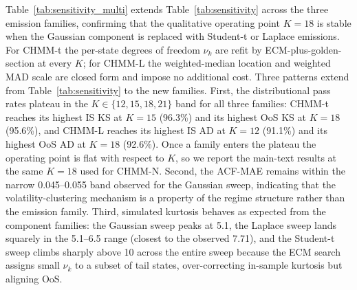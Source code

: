 Table~\ref{tab:sensitivity_multi} extends Table~\ref{tab:sensitivity} across the three emission families, confirming that the qualitative operating point $K = 18$ is stable when the Gaussian component is replaced with Student-t or Laplace emissions.
For CHMM-t the per-state degrees of freedom $\nu_k$ are refit by ECM-plus-golden-section at every $K$; for CHMM-L the weighted-median location and weighted MAD scale are closed form and impose no additional cost.
Three patterns extend from Table~\ref{tab:sensitivity} to the new families.
First, the distributional pass rates plateau in the $K \in \{12, 15, 18, 21\}$ band for all three families: CHMM-t reaches its highest IS KS at $K = 15$ (96.3\%) and its highest OoS KS at $K = 18$ (95.6\%), and CHMM-L reaches its highest IS AD at $K = 12$ (91.1\%) and its highest OoS AD at $K = 18$ (92.6\%).
Once a family enters the plateau the operating point is flat with respect to $K$, so we report the main-text results at the same $K = 18$ used for CHMM-N.
Second, the ACF-MAE remains within the narrow 0.045--0.055 band observed for the Gaussian sweep, indicating that the volatility-clustering mechanism is a property of the regime structure rather than the emission family.
Third, simulated kurtosis behaves as expected from the component families: the Gaussian sweep peaks at 5.1, the Laplace sweep lands squarely in the 5.1--6.5 range (closest to the observed 7.71), and the Student-t sweep climbs sharply above 10 across the entire sweep because the ECM search assigns small $\nu_k$ to a subset of tail states, over-correcting in-sample kurtosis but aligning OoS.


